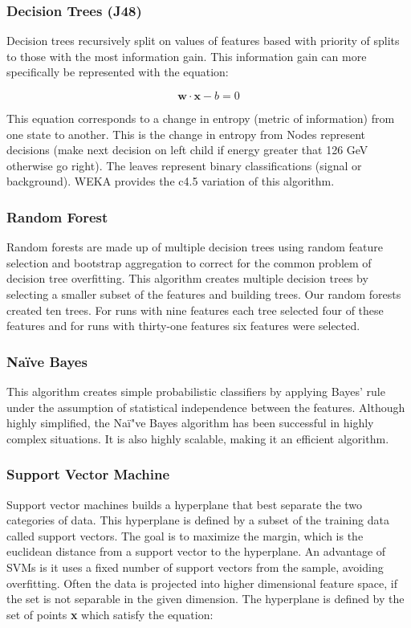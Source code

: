 \documentclass[aps, reprint, amsmath, amssymb]{revtex4-1}
\begin{document}
\subsubsection{Decision Trees (J48)}
Decision trees recursively split on values of features based with priority of splits to those with the most information gain. This information gain can more specifically be represented with the equation:

\begin{equation}
\mathbf{w} \cdot \mathbf{x} - b = 0
\end{equation}

This equation corresponds to a change in entropy (metric of information) from one state to another. This is the change in entropy from Nodes represent decisions (make next decision on left child if energy greater that 126 GeV otherwise go right). The leaves represent binary classifications (signal or background). WEKA provides the c4.5 variation of this algorithm.

\subsubsection{Random Forest}
Random forests are made up of multiple decision trees using random feature selection and bootstrap aggregation to correct for the common problem of decision tree overfitting.  This algorithm creates multiple decision trees by selecting a smaller subset of the features and building trees. Our random forests created ten trees.  For runs with nine features each tree selected four of these features and for runs with thirty-one features six features were selected.

\subsubsection{Na{\"i}ve Bayes}
This algorithm creates simple probabilistic classifiers by applying Bayes' rule under the assumption of statistical independence between the features.  Although highly simplified, the Na{\"i"}ve Bayes algorithm has been successful in highly complex situations.  It is also highly scalable, making it an efficient algorithm.  

\subsubsection{Support Vector Machine}
Support vector machines builds a hyperplane that best separate the two categories of data. This hyperplane is defined by a subset of the training data called support vectors. The goal is to maximize the margin, which is the euclidean distance from a support vector to the hyperplane.  An advantage of SVMs is it uses a fixed number of support vectors from the sample, avoiding overfitting.  Often the data is projected into higher dimensional feature space, if the set is not separable in the given dimension.  The hyperplane is defined by the set of points \textbf{x} which satisfy the equation:
\end{document}
